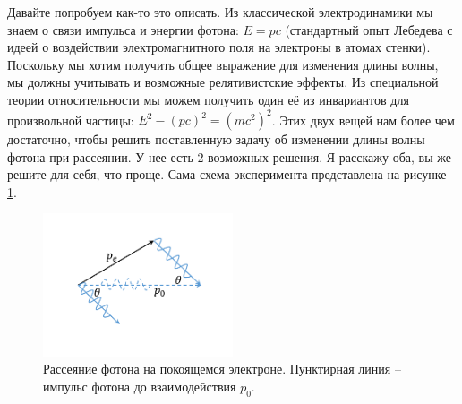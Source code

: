 \documentclass[12pt]{article}
\begin{document}
Давайте попробуем как-то это описать. Из классической электродинамики мы знаем о связи импульса и энергии фотона: $E = pc$ (стандартный опыт Лебедева с идеей о воздействии электромагнитного поля на электроны в атомах стенки). Поскольку мы хотим получить общее выражение для изменения длины волны, мы должны учитывать и возможные релятивистские эффекты. Из специальной теории относительности мы можем получить  один её из инвариантов для произвольной частицы: $E^2 -(pc)^2 = (mc^2)^2$. Этих двух вещей нам более чем достаточно, чтобы решить поставленную задачу об изменении длины волны фотона при рассеянии. У нее есть 2 возможных решения. Я расскажу оба, вы же решите для себя, что проще. Сама схема эксперимента представлена на рисунке \ref{fig:sem_02_kompton}.
\begin{figure}[h]
    \centering
    \includegraphics[width=0.5\textwidth,keepaspectratio]{Seminar_02/pics/pic_03.pdf}
    \caption{Рассеяние фотона на покоящемся электроне. Пунктирная линия -- импульс фотона до взаимодействия $p_0$.}
    \label{fig:sem_02_kompton}
\end{figure}
\end{document}
